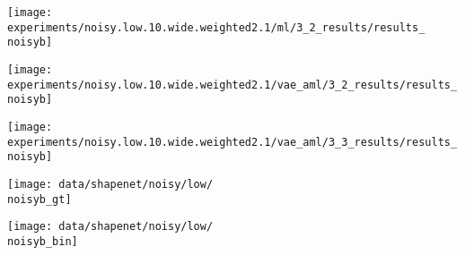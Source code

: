 {\begin{minipage}[t]{0.10\textwidth}
    \vspace{0px}\centering
    \texttt{[image: experiments/noisy.low.10.wide.weighted2.1/ml/3\_2\_results/results\_\\noisyb]}
\end{minipage}
\begin{minipage}[t]{0.10\textwidth}
   	\vspace{0px}\centering
   	\texttt{[image: experiments/noisy.low.10.wide.weighted2.1/vae\_aml/3\_2\_results/results\_\\noisyb]}
\end{minipage}
\begin{minipage}[t]{0.10\textwidth}
   	\vspace{0px}\centering
   	\texttt{[image: experiments/noisy.low.10.wide.weighted2.1/vae\_aml/3\_3\_results/results\_\\noisyb]}
\end{minipage}
\begin{minipage}[t]{0.10\textwidth}
   	\vspace{0px}\centering
   	\texttt{[image: data/shapenet/noisy/low/\\noisyb\_gt]}
\end{minipage}
\begin{minipage}[t]{0.10\textwidth}
   	\vspace{0px}\centering
   	\texttt{[image: data/shapenet/noisy/low/\\noisyb\_bin]}
\end{minipage}
\\[2mm]
\hspace*{-6px}
\begin{minipage}[t]{0.02\textwidth}
    \vspace{0px}\centering

\end{minipage}}
